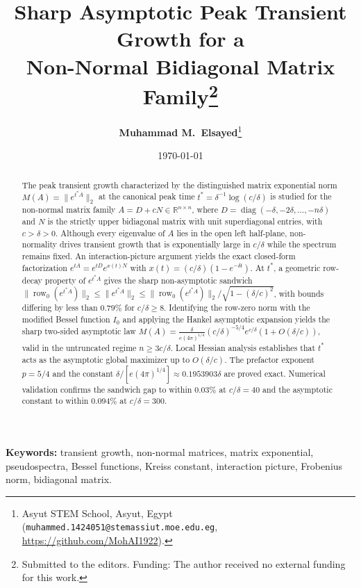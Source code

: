 \documentclass[11pt,reqno]{article}
\title{\textbf{Sharp Asymptotic Peak Transient Growth for a\\
Non-Normal Bidiagonal Matrix Family}\thanks{Submitted to the editors. Funding: The author received no external funding for this work.}}
\author{\textbf{Muhammad M.\ Elsayed}\thanks{Asyut STEM School, Asyut, Egypt (\texttt{muhammed.1424051@stemassiut.moe.edu.eg}, \url{https://github.com/MohAI1922}).}}
\date{\today}
\theoremstyle{plain}
\theoremstyle{definition}
\theoremstyle{remark}
\numberwithin{equation}{section}
\begin{document}

\maketitle

\begin{abstract}
The peak transient growth characterized by the distinguished matrix exponential norm $M(A) = \|e^{t^*A}\|_2$ at the canonical peak time $t^* = \delta^{-1}\log(c/\delta)$ is studied for the non-normal matrix family $A = D + cN \in \mathbb{R}^{n\times n}$, where $D = \operatorname{diag}(-\delta, -2\delta, \dots, -n\delta)$ and $N$ is the strictly upper bidiagonal matrix with unit superdiagonal entries, with $c > \delta > 0$. Although every eigenvalue of $A$ lies in the open left half-plane, non-normality drives transient growth that is exponentially large in $c/\delta$ while the spectrum remains fixed. An interaction-picture argument yields the exact closed-form factorization $e^{tA} = e^{tD}e^{x(t)N}$ with $x(t) = (c/\delta)(1 - e^{-\delta t})$. At $t^*$, a geometric row-decay property of $e^{t^*A}$ gives the sharp non-asymptotic sandwich $\|\operatorname{row}_0(e^{t^*A})\|_2 \le \|e^{t^*A}\|_2 \le \|\operatorname{row}_0(e^{t^*A})\|_2 / \sqrt{1 - (\delta/c)^2}$, with bounds differing by less than $0.79\%$ for $c/\delta \ge 8$. Identifying the row-zero norm with the modified Bessel function $I_0$ and applying the Hankel asymptotic expansion yields the sharp two-sided asymptotic law $M(A) = \frac{\delta}{e(4\pi)^{1/4}} (c/\delta)^{-5/4} e^{c/\delta} (1 + O(\delta/c))$, valid in the untruncated regime $n \ge 3c/\delta$. Local Hessian analysis establishes that $t^*$ acts as the asymptotic global maximizer up to $O(\delta/c)$. The prefactor exponent $p = 5/4$ and the constant $\delta/[e(4\pi)^{1/4}] \approx 0.1953903\delta$ are proved exact. Numerical validation confirms the sandwich gap to within $0.03\%$ at $c/\delta = 40$ and the asymptotic constant to within $0.094\%$ at $c/\delta = 300$.
\end{abstract}

\vspace{0.8em}
\noindent\textbf{Keywords:} transient growth, non-normal matrices, matrix exponential, pseudospectra, Bessel functions, Kreiss constant, interaction picture, Frobenius norm, bidiagonal matrix.
\end{document}
